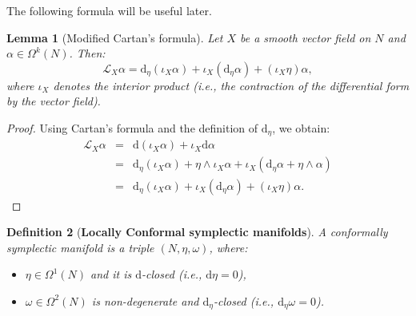 \documentclass[11pt]{article}
\newtheorem{lemma}{Lemma}
\newtheorem{definition}[lemma]{Definition}
\theoremstyle{definition}
\def\d{\mathrm{d}}
\begin{document}
\noindent The following formula will be useful later.\\

\begin{lemma}[Modified Cartan's formula] \label{lemma3}
  Let $X$ be a smooth vector field on $N$ and $\alpha \in \Omega^k(N)$. Then:
  \[
{\mathcal L}_X\alpha = \d_\eta (\iota_X\alpha) + \iota_X(\d_\eta\alpha) + (\iota_X\eta)\alpha,
  \]
 where $\iota_X$ denotes the interior product ({\it i.e.}, the contraction of the differential form by the vector field).
\end{lemma}

\medskip

\begin{proof} Using Cartan's formula and the definition of $\d_\eta$, we obtain:
\begin{eqnarray*}
{\mathcal L}_X \alpha &=& \d \left(\iota_X \alpha\right ) + \iota_X \d\alpha \\
&=& 
\d_\eta \left(\iota_X \alpha\right ) + \eta\wedge \iota_X \alpha + \iota_X \left( \d_\eta \alpha + \eta \wedge \alpha \right) \\
&=& \d_\eta \left(\iota_X \alpha\right ) + 
\iota_X \left( \d_\eta \alpha \right)
+ (\iota_X\eta)\alpha.
 \end{eqnarray*}
\end{proof}


\bigskip

\begin{definition}[{\bf Locally Conformal symplectic manifolds}]
A {\it conformally symplectic manifold} is a triple $(N, \eta, \omega)$, where:
\begin{itemize}
\item $\eta \in \Omega^1(N)$ and it is $\d$-closed ({\it i.e.}, $\d\eta=0$),
\item $\omega \in \Omega^2(N)$ is non-degenerate and $\d_\eta$-closed ({\it i.e.}, $\d_\eta \omega=0$).\\
 \end{itemize}
 \end{definition}
 
 \medskip
\end{document}
